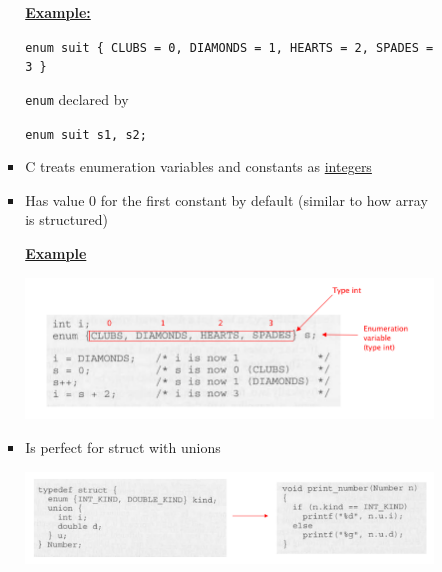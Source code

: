 \documentclass[12pt]{article}
\begin{document}
\begin{enumerate}[1.]
\begin{enumerate}[a)]
\begin{itemize}
\begin{itemize}
                \underline{\textbf{Example:}}

                \bigskip

                \texttt{enum suit \{ CLUBS = 0, DIAMONDS = 1, HEARTS = 2, SPADES = 3 \}}

                \bigskip

                \texttt{enum} declared by

                \bigskip

                \texttt{enum suit s1, s2;}

                \item C treats enumeration variables and constants as \underline{integers}
                \item Has value 0 for the first constant by default (similar to how array is structured)

                \bigskip

                \underline{\textbf{Example}}

                \begin{center}
                \includegraphics[width=\linewidth]{images/review_7_solution_12.png}
                \end{center}

                \item Is perfect for struct with unions

                \begin{center}
                \includegraphics[width=\linewidth]{images/review_7_solution_13.png}
                \end{center}
            \end{itemize}
        \end{itemize}


\end{enumerate}
\end{enumerate}
\end{document}
